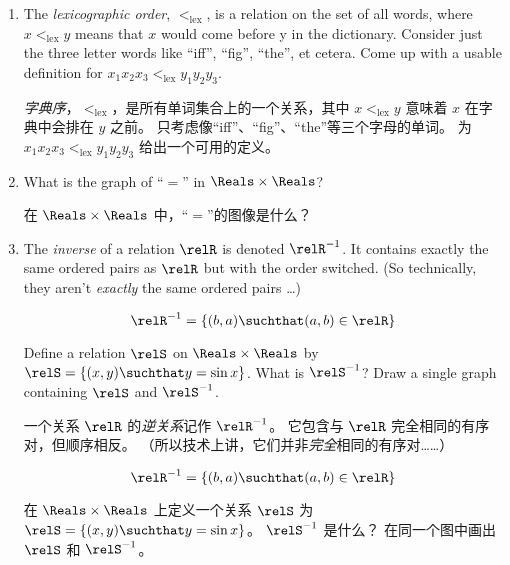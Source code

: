 \begin{enumerate}
    \item The \emph{lexicographic order}, 
    $<_{\mbox{lex}}$, is a relation on the
    set of all words, where $x <_{\mbox{lex}} y$ means that $x$ would come before
    y in the dictionary.
    Consider just the three letter words like ``iff'',
    ``fig'', ``the'', et cetera.
    Come up with a usable definition for
    $x_1x_2x_3  <_{\mbox{lex}} y_1y_2y_3$.
    
    \noindent  {}\emph{字典序}，$<_{\mbox{lex}}$，是所有单词集合上的一个关系，其中 $x <_{\mbox{lex}} y$ 意味着 $x$ 在字典中会排在 $y$ 之前。
    只考虑像“iff”、“fig”、“the”等三个字母的单词。
    为 $x_1x_2x_3 <_{\mbox{lex}} y_1y_2y_3$ 给出一个可用的定义。
    
    \wbvfill
    
    \workbookpagebreak
    
    \item What is the graph of ``$=$'' in $\Reals \times \Reals$?
    
    \noindent  在 $\Reals \times \Reals$ 中，“$=$”的图像是什么？
    
    \wbvfill
    
    
    \item The  \emph{inverse} of a relation $\relR$
    is denoted $\relR^{-1}$.
    It contains exactly the same ordered pairs
    as $\relR$ but with the order switched.
    (So technically, they aren't
    \emph{exactly} the same ordered pairs \ldots)
    
    \[ \relR^{-1} = \{ (b,a) \suchthat (a,b) \in \relR \} \]
    
    \noindent Define a relation $\relS$ on $\Reals \times \Reals$ by
    $\relS = \{ (x,y) \suchthat y = \sin x \}$.
    What is $\relS^{-1}$?
    Draw a single graph containing $\relS$ and $\relS^{-1}$.
    
    \noindent 一个关系 $\relR$ 的\emph{逆关系}记作 $\relR^{-1}$。
    它包含与 $\relR$ 完全相同的有序对，但顺序相反。
    （所以技术上讲，它们并非\emph{完全}相同的有序对……）
    
    \[ \relR^{-1} = \{ (b,a) \suchthat (a,b) \in \relR \} \]
    
    \noindent 在 $\Reals \times \Reals$ 上定义一个关系 $\relS$ 为
    $\relS = \{ (x,y) \suchthat y = \sin x \}$。
    $\relS^{-1}$ 是什么？
    在同一个图中画出 $\relS$ 和 $\relS^{-1}$。
    

\end{enumerate}
